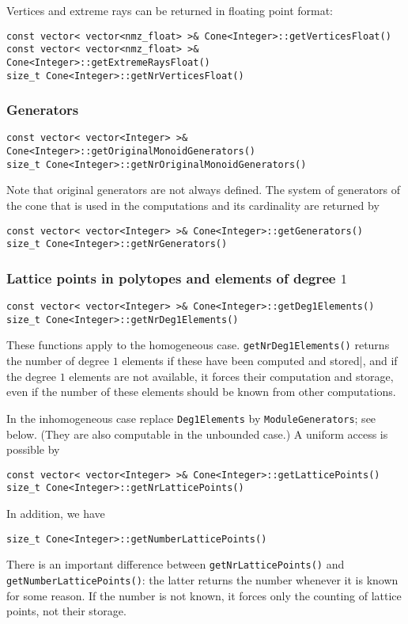 \documentclass[12pt,a4paper]{scrartcl}
\theoremstyle{definition}
\begin{document}
\begin{small}
Vertices and extreme rays can be returned in floating point format:
\begin{Verbatim}
const vector< vector<nmz_float> >& Cone<Integer>::getVerticesFloat()
const vector< vector<nmz_float> >& Cone<Integer>::getExtremeRaysFloat()
size_t Cone<Integer>::getNrVerticesFloat()
\end{Verbatim}

\subsubsection{Generators}

\begin{Verbatim}
const vector< vector<Integer> >& Cone<Integer>::getOriginalMonoidGenerators()
size_t Cone<Integer>::getNrOriginalMonoidGenerators()
\end{Verbatim}
Note that original generators are not always defined. The system of generators of the cone that is used in the computations and its cardinality are returned by
\begin{Verbatim}
const vector< vector<Integer> >& Cone<Integer>::getGenerators()
size_t Cone<Integer>::getNrGenerators()
\end{Verbatim}

\subsubsection{Lattice points in polytopes and elements of degree $1$}

\begin{Verbatim}
const vector< vector<Integer> >& Cone<Integer>::getDeg1Elements()
size_t Cone<Integer>::getNrDeg1Elements()
\end{Verbatim}
These functions apply to the homogeneous case. \verb|getNrDeg1Elements()| returns the number of degree $1$ elements if these have been computed and stored|, and if the degree $1$ elements are not available, it forces their computation and storage, even if the number of these elements should be known from other computations.

In the inhomogeneous case replace \verb|Deg1Elements| by \verb|ModuleGenerators|; see below. (They are also computable in the unbounded case.) A uniform access is possible by
\begin{Verbatim}
const vector< vector<Integer> >& Cone<Integer>::getLatticePoints()
size_t Cone<Integer>::getNrLatticePoints()
\end{Verbatim}

In addition, we have
\begin{Verbatim}
size_t Cone<Integer>::getNumberLatticePoints()
\end{Verbatim}
There is an important difference between \verb|getNrLatticePoints()| and \verb|getNumberLatticePoints()|: the latter returns the number whenever it is known for some reason. If the number is not known, it forces only the counting of lattice points, not their storage.


\end{small}
\end{document}
